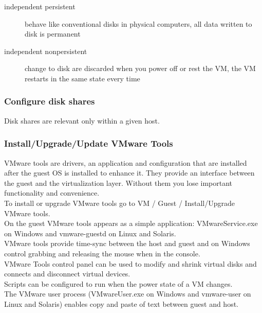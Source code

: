 \begin{description}

\item[independent persistent]
behave like conventional disks in physical computers, all data written to
disk is permanent

\item[independent nonpersistent]
change to disk are discarded when you power off or rest the VM, the VM restarts
in the same state every time

\end{description}

\subsubsection{Configure disk shares}

Disk shares are relevant only within a given host.

\subsubsection{Install/Upgrade/Update VMware Tools}

VMware tools are drivers, an application and configuration that are installed
after the guest OS is installed to enhance it. They provide an interface
between the guest and the virtualization layer. Without them you lose
important functionality and convenience.\\

To install or upgrade VMware tools go to VM / Guest / Install/Upgrade VMware
tools.\\

On the guest VMware tools appears as a simple application: VMwareService.exe
on Windows and vmware-guestd on Linux and Solaris.\\

VMware tools provide time-sync between the host and guest and on Windows
control grabbing and releasing the mouse when in the console.\\

VMware Tools control panel can be used to modify and shrink virtual disks and
connects and disconnect virtual devices.\\

Scripts can be configured to run when the power state of a VM changes.\\

The VMware user process (VMwareUser.exe on Windows and vmware-user on Linux
and Solaris) enables copy and paste of text between guest and host.\\

